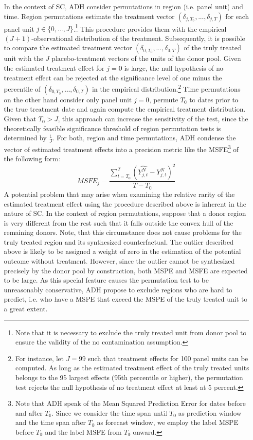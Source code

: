 In the context of \ac{SC}, \ac{ADH} consider permutations in region (i.e. panel unit) and time. Region permutations estimate the treatment vector $(\delta_{j,T_0}, ..., \delta_{j,T})$ for each panel unit $j \in \{0, ..., J \}$.\footnote{Note that it is necessary to exclude the truly treated unit from donor pool to ensure the validity of the no contamination assumption.} This procedure provides them with the empirical $(J+1)$-observational distribution of the treatment. Subsequently, it is possible to compare the estimated treatment vector $(\delta_{0,T_0}, ..., \delta_{0,T})$ of the truly treated unit with the $J$ placebo-treatment vectors of the units of the donor pool. Given the estimated treatment effect for $j=0$ is large, the null hypothesis of no treatment effect can be rejected at the significance level of one minus the percentile of $(\delta_{0,T_0}, ..., \delta_{0,T})$ in the empirical distribution.\footnote{For instance, let $J = 99$ such that treatment effects for 100 panel units can be computed. As long as the estimated treatment effect of the truly treated units belongs to the 95 largest effects (95th percentile or higher), the permutation test rejects the null hypothesis of no treatment effect at least at 5 percent.} Time permutations on the other hand consider only panel unit $j = 0$, permute $T_0$ to dates prior to the true treatment date and again compute the empirical treatment distribution. Given that $T_0 > J$, this approach can increase the sensitivity of the test, since the theoretically feasible significance threshold of region permutation tests is determined by $\frac{1}{J}$. For both, region and time permutations, \ac{ADH} condense the vector of estimated treatment effects into a precision metric like the \ac{MSFE}\footnote{Note that \ac{ADH} speak of the Mean Squared Prediction Error for dates before and after $T_0$. Since we consider the time span until $T_0$ as prediction window and the time span after $T_0$ as forecast window, we employ the label \ac{MSPE} before $T_0$ and the label \ac{MSFE} from $T_0$ onward.} of the following form:
\[
MSFE_j = \frac{\sum_{t = T_0}^{T} \left(\widehat{Y_{j,t}^N} - Y_{j,t}^N\right) ^2}{T- T_0}
\]
A potential problem that may arise when examining the relative rarity of the estimated treatment effect using the procedure described above is inherent in the nature of \ac{SC}. In the context of region permutations, suppose that a donor region is very different from the rest such that it falls outside the convex hull of the remaining donors. Note, that this circumstance does not cause problems for the truly treated region and its synthesized counterfactual. The outlier described above is likely to be assigned a weight of zero in the estimation of the potential outcome without treatment. However, since the outlier cannot be synthesized precisely by the donor pool by construction, both \ac{MSPE} and \ac{MSFE} are expected to be large. As this special feature causes the permutation test to be unreasonably conservative, \ac{ADH} propose to exclude regions who are hard to predict, i.e. who have a \ac{MSPE} that exceed the \ac{MSPE} of the truly treated unit to a great extent. 

